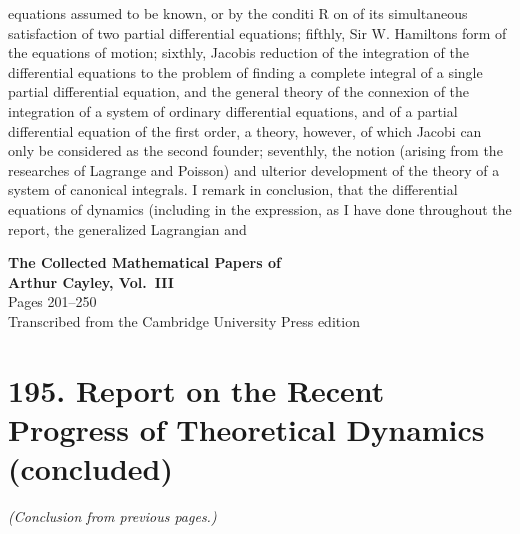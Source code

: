 \documentclass[11pt,a4paper]{book}
\begin{document}
equations assumed to be known, or by the conditi R on of its simultaneous satisfaction of
two partial differential equations; fifthly, Sir W. Hamiltons form of the equations
of motion; sixthly, Jacobis reduction of the integration of the differential equations
to the problem of finding a complete integral of a single partial differential equation,
and the general theory of the connexion of the integration of a system of ordinary
differential equations, and of a partial differential equation of the first order, a theory,
however, of which Jacobi can only be considered as the second founder; seventhly, the
notion (arising from the researches of Lagrange and Poisson) and ulterior development
of the theory of a system of canonical integrals.
I remark in conclusion, that the differential equations of dynamics (including in
the expression, as I have done throughout the report, the generalized Lagrangian and
\clearpage


\begin{center}
{\Large\bfseries The Collected Mathematical Papers of\\[0.5em] Arthur Cayley, Vol.~III}\\[2em]
{\large Pages 201--250}\\[1em]
{\normalsize Transcribed from the Cambridge University Press edition}
\end{center}

\vspace{2em}


\newpage


\section*{195. Report on the Recent Progress of Theoretical Dynamics (concluded)}

\noindent\textit{(Conclusion from previous pages.)}

\medskip
\end{document}
